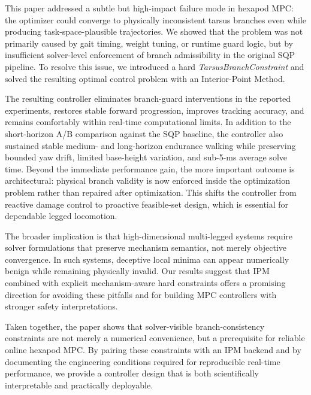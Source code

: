 This paper addressed a subtle but high-impact failure mode in hexapod MPC: the optimizer could converge to physically inconsistent tarsus branches even while producing task-space-plausible trajectories. We showed that the problem was not primarily caused by gait timing, weight tuning, or runtime guard logic, but by insufficient solver-level enforcement of branch admissibility in the original SQP pipeline. To resolve this issue, we introduced a hard \emph{TarsusBranchConstraint} and solved the resulting optimal control problem with an Interior-Point Method.

The resulting controller eliminates branch-guard interventions in the reported experiments, restores stable forward progression, improves tracking accuracy, and remains comfortably within real-time computational limits. In addition to the short-horizon A/B comparison against the SQP baseline, the controller also sustained stable medium- and long-horizon endurance walking while preserving bounded yaw drift, limited base-height variation, and sub-5-ms average solve time. Beyond the immediate performance gain, the more important outcome is architectural: physical branch validity is now enforced inside the optimization problem rather than repaired after optimization. This shifts the controller from reactive damage control to proactive feasible-set design, which is essential for dependable legged locomotion.

The broader implication is that high-dimensional multi-legged systems require solver formulations that preserve mechanism semantics, not merely objective convergence. In such systems, deceptive local minima can appear numerically benign while remaining physically invalid. Our results suggest that IPM combined with explicit mechanism-aware hard constraints offers a promising direction for avoiding these pitfalls and for building MPC controllers with stronger safety interpretations.

Taken together, the paper shows that solver-visible branch-consistency constraints are not merely a numerical convenience, but a prerequisite for reliable online hexapod MPC. By pairing these constraints with an IPM backend and by documenting the engineering conditions required for reproducible real-time performance, we provide a controller design that is both scientifically interpretable and practically deployable.
